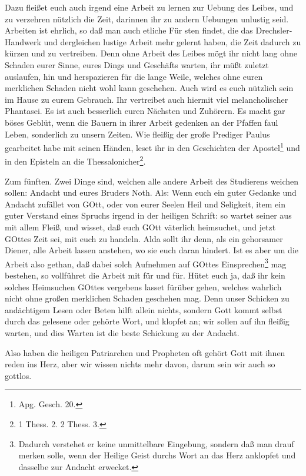 Dazu fleißet euch auch irgend eine Arbeit zu lernen zur Uebung des Leibes, und zu verzehren nützlich die Zeit, darinnen ihr zu andern Uebungen unlustig seid. Arbeiten ist ehrlich, so daß man auch etliche Für%
sten findet, die das Drechsler-Handwerk und dergleichen lustige Arbeit mehr gelernt haben, die Zeit dadurch zu kürzen und zu vertreiben. Denn ohne Arbeit des Leibes mögt ihr nicht lang ohne Schaden eurer Sinne, eures Dings und Geschäfts warten, ihr müßt zuletzt auslaufen, hin und herspazieren für die lange Weile, welches ohne euren merklichen Schaden nicht wohl kann geschehen. Auch wird es euch nützlich sein im Hause zu eurem Gebrauch. Ihr vertreibet auch hiermit viel melancholischer Phantasei. Es ist auch besserlich euren Nächsten und Zuhörern. Es macht gar böses Geblüt, wenn die Bauern in ihrer Arbeit gedenken an der Pfaffen faul Leben, sonderlich zu unsern Zeiten. Wie fleißig der große Prediger Paulus gearbeitet habe mit seinen Händen, leset ihr in den Geschichten der Apostel\footnote{Apg. Gesch. 20.} und in den Episteln an die Thessalonicher\footnote{1 Thess. 2. 2 Thess. 3.}.

Zum fünften. Zwei Dinge sind, welchen alle andere Arbeit des Studierens weichen sollen: Andacht und eures Bruders Noth. Als: Wenn euch ein guter Gedanke und Andacht zufället von GOtt, oder von eurer Seelen Heil und Seligkeit, item ein guter Verstand eines Spruchs irgend in der heiligen Schrift: so wartet seiner aus mit allem Fleiß, und wisset, daß euch GOtt väterlich heimsuchet, und jetzt GOttes Zeit sei, mit euch zu handeln. Alda sollt ihr denn, als ein gehorsamer Diener, alle Arbeit lassen anstehen, wo sie euch daran hindert. Ist es aber um die Arbeit also gethan, daß dabei solch Aufnehmen auf GOttes Einsprechen\footnote{Dadurch verstehet er keine unmittelbare Eingebung, sondern daß man drauf merken solle, wenn der Heilige Geist durchs Wort an das Herz anklopfet und dasselbe zur Andacht erwecket.} mag bestehen, so vollführet die Arbeit mit für und für. Hütet euch ja, daß ihr kein solches Heimsuchen GOttes
vergebens lasset fürüber gehen, welches wahrlich nicht ohne großen merklichen Schaden geschehen mag. Denn unser Schicken zu andächtigem Lesen oder Beten hilft allein nichts, sondern Gott kommt selbst durch das gelesene oder gehörte Wort, und klopfet an; wir sollen auf ihn fleißig warten, und dies Warten ist die beste Schickung zu der Andacht.

Also haben die heiligen Patriarchen und Propheten oft gehört Gott mit ihnen reden ins Herz, aber wir wissen nichts mehr davon, darum sein wir auch so gottlos.


